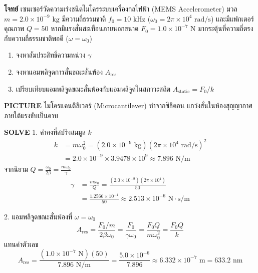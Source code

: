 \begin{mathexample}
\textbf{โจทย์} เซนเซอร์วัดความเร่งชนิดไมโครระบบเครื่องกลไฟฟ้า (MEMS Accelerometer) มวล $m = 2.0 \times 10^{-9}\text{ kg}$ มีความถี่ธรรมชาติ $f_0 = 10\text{ kHz}$ ($\omega_0 = 2\pi \times 10^4\text{ rad/s}$) และมีแฟกเตอร์คุณภาพ $Q = 50$ หากมีแรงสั่นสะเทือนภายนอกขนาด $F_0 = 1.0 \times 10^{-7}\text{ N}$ มากระตุ้นที่ความถี่ตรงกับความถี่ธรรมชาติพอดี ($\omega = \omega_0$)
\begin{enumerate}
    \item จงหาสัมประสิทธิ์ความหน่วง $\gamma$
    \item จงหาแอมพลิจูดการสั่นขณะสั่นพ้อง $A_{\text{res}}$
    \item เปรียบเทียบแอมพลิจูดขณะสั่นพ้องกับแอมพลิจูดในสภาวะสถิต $A_{\text{static}} = F_0/k$
\end{enumerate}

\vspace{0.2cm}
\textbf{PICTURE} ไมโครแคนติลิเวอร์ (Microcantilever) ทำจากซิลิคอน แกว่งสั่นในห้องสุญญากาศภายใต้แรงขับเป็นคาบ

\vspace{0.2cm}
\textbf{SOLVE}
1. ค่าคงที่สปริงสมมูล $k$
\begin{align}
k &= m\omega_0^2 = (2.0 \times 10^{-9}\text{ kg})(2\pi \times 10^4\text{ rad/s})^2 \nonumber\\
&= 2.0 \times 10^{-9} \times 3.9478 \times 10^9 \approx 7.896\text{ N/m}
\end{align}
จากนิยาม $Q = \frac{\omega_0}{2\beta} = \frac{m\omega_0}{\gamma}$
\begin{align}
\gamma &= \frac{m\omega_0}{Q} = \frac{(2.0 \times 10^{-9})(2\pi \times 10^4)}{50} \nonumber\\
&= \frac{1.2566 \times 10^{-4}}{50} \approx 2.513 \times 10^{-6}\text{ N}\cdot\text{s/m}
\end{align}

2. แอมพลิจูดขณะสั่นพ้องที่ $\omega = \omega_0$
\begin{equation}
A_{\text{res}} = \frac{F_0 / m}{2\beta\omega_0} = \frac{F_0}{\gamma\omega_0} = \frac{F_0 Q}{m\omega_0^2} = \frac{F_0 Q}{k}
\end{equation}
แทนค่าตัวเลข
\begin{equation}
A_{\text{res}} = \frac{(1.0 \times 10^{-7}\text{ N})(50)}{7.896\text{ N/m}} = \frac{5.0 \times 10^{-6}}{7.896} \approx 6.332 \times 10^{-7}\text{ m} = 633.2\text{ nm}
\end{equation}


\end{mathexample}
